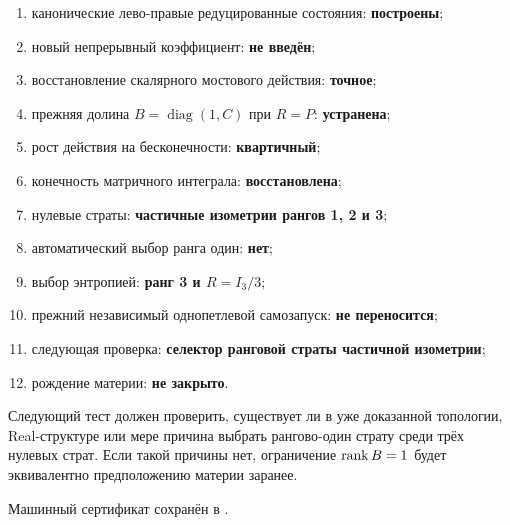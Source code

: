 \begin{protocol}
\begin{enumerate}
 \item канонические лево-правые редуцированные состояния:
 \textbf{построены};
 \item новый непрерывный коэффициент:
 \textbf{не введён};
 \item восстановление скалярного мостового действия:
 \textbf{точное};
 \item прежняя долина $B=\operatorname{diag}(1,C)$ при $R=P$:
 \textbf{устранена};
 \item рост действия на бесконечности:
 \textbf{квартичный};
 \item конечность матричного интеграла:
 \textbf{восстановлена};
 \item нулевые страты:
 \textbf{частичные изометрии рангов 1, 2 и 3};
 \item автоматический выбор ранга один:
 \textbf{нет};
 \item выбор энтропией:
 \textbf{ранг 3 и $R=I_3/3$};
 \item прежний независимый однопетлевой самозапуск:
 \textbf{не переносится};
 \item следующая проверка:
 \textbf{селектор ранговой страты частичной изометрии};
 \item рождение материи:
 \textbf{не закрыто}.
\end{enumerate}
\end{protocol}

Следующий тест должен проверить, существует ли в уже доказанной
топологии, Real-структуре или мере причина выбрать рангово-один страту
среди трёх нулевых страт. Если такой причины нет, ограничение
$\operatorname{rank} B=1$ будет эквивалентно предположению материи заранее.

Машинный сертификат сохранён в
.